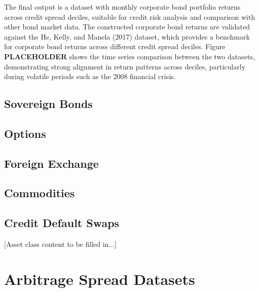\documentclass{article}
\begin{document}
The final output is a dataset with monthly corporate bond portfolio returns across credit spread deciles, suitable for credit risk analysis and comparison with other bond market data.
The constructed corporate bond returns are validated against the He, Kelly, and Manela (2017) dataset, which provides a benchmark for corporate bond returns across different credit spread deciles. Figure \textbf{PLACEHOLDER} shows the time series comparison between the two datasets, demonstrating strong alignment in return patterns across deciles, particularly during volatile periods such as the 2008 financial crisis.

\subsection{Sovereign Bonds}
\label{sec:sovereign}

\subsection{Options}
\label{sec:options}

\subsection{Foreign Exchange}
\label{sec:fx}

\subsection{Commodities}
\label{sec:commodities}

\subsection{Credit Default Swaps}
\label{sec:cds}

[Asset class content to be filled in...]

\section{Arbitrage Spread Datasets}
\label{sec:arbitrage}

\end{document}

